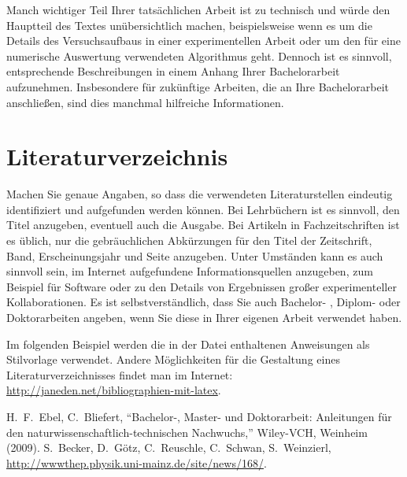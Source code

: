 \documentclass[a4paper,11pt,oneside,final,german,openbib,pdftex]{scrbook}
\begin{document}
\begin{appendix}
Manch wichtiger Teil Ihrer tats\"achlichen Arbeit ist zu technisch 
und w\"urde den Hauptteil des Textes un\"ubersichtlich machen, 
beispielsweise wenn es um die Details des Versuchsaufbaus in einer 
experimentellen Arbeit oder um den f\"ur eine numerische Auswertung 
verwendeten Algorithmus geht. Dennoch ist es sinnvoll, entsprechende 
Beschreibungen in einem Anhang Ihrer Bachelorarbeit aufzunehmen. 
Insbesondere f\"ur zuk\"unftige Arbeiten, die an Ihre Bachelorarbeit 
anschlie{\ss}en, sind dies manchmal hilfreiche Informationen.

\chapter{Literaturverzeichnis}

Machen Sie genaue Angaben, so dass die verwendeten Literaturstellen 
eindeutig identifiziert und aufgefunden werden k\"onnen.
Bei Lehrb\"uchern \cite{Weinberg:1995mt} ist es sinnvoll, 
den Titel anzugeben, eventuell auch die Ausgabe. Bei Artikeln in 
Fachzeitschriften \cite{Moch:2001zr} ist es \"ublich, nur die 
gebr\"auchlichen Abk\"urzungen f\"ur den Titel der Zeitschrift, Band, 
Erscheinungsjahr und Seite anzugeben. Unter Umst\"anden kann es auch 
sinnvoll sein, im Internet aufgefundene Informationsquellen anzugeben, 
zum Beispiel f\"ur Software \cite{LoopTools} oder zu den Details von 
Ergebnissen gro{\ss}er experimenteller Kollaborationen. Es ist 
selbstverst\"andlich, dass Sie auch Bachelor- \cite{BA:Freund}, 
Diplom- oder Doktorarbeiten angeben, wenn Sie diese in Ihrer eigenen 
Arbeit verwendet haben.
\medskip

Im folgenden Beispiel werden die in der Datei %
enthaltenen Anweisungen als Stilvorlage verwendet. Andere 
M\"oglichkeiten f\"ur die Gestaltung eines Literaturverzeichnisses 
findet man im Internet: \url{http://janeden.net/bibliographien-mit-latex}.

\renewcommand{\bibname}{\bfont Literaturverzeichnis} 

\begin{thebibliography}{99}

H.\ F.\ Ebel, C.\ Bliefert, 
  ``Bachelor-, Master- und Doktorarbeit: Anleitungen f\"ur den 
  naturwissenschaftlich-technischen Nachwuchs,''
  Wiley-VCH, Weinheim (2009). 
  S.~Becker, D.~G\"otz, C.~Reuschle, C.~Schwan, S.~Weinzierl,  
  \url{http://wwwthep.physik.uni-mainz.de/site/news/168/}.


\end{thebibliography}
\end{appendix}
\end{document}
